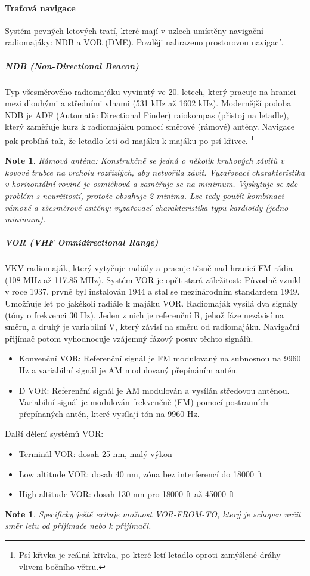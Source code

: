 \documentclass[11pt,a4paper]{article}
\theoremstyle{my-theorem}
\theoremstyle{non-theorem}
\newtheorem{note}[theorem]{Note}
\begin{document}
\paragraph*{Traťová navigace} Systém pevných letových tratí, které mají v uzlech umístěny navigační radiomajáky: NDB a VOR (DME). Později nahrazeno prostorovou navigací.

\subparagraph*{NDB (Non-Directional Beacon)} Typ všesměrového radiomajáku vyvinutý ve 20. letech, který pracuje na hranici mezi dlouhými a středními vlnami (531 kHz až 1602 kHz). Modernější podoba NDB je ADF (Automatic Directional Finder) raiokompas (přistoj na letadle), který zaměřuje kurz k radiomajáku pomocí směrové (rámové) antény. Navigace pak probíhá tak, že letadlo letí od majáku k majáku po psí křivce.%
    \footnote{Psí křivka je reálná křivka, po které letí letadlo oproti zamýšlené dráhy vlivem bočního větru.}
\begin{note}
    \emph{Rámová anténa:} Konstrukčně se jedná o několik kruhových závitů v kovové trubce na vrcholu rozřízlých, aby netvořila závit. Vyzařovací charakteristika v horizontální rovině je osmičková a zaměřuje se na minimum. Vyskytuje se zde problém s neurčitostí, protože obsahuje 2 minima. Lze tedy použít kombinaci rámové a všesměrové antény: vyzařovací charakteristika typu kardioidy (jedno minimum).
\end{note}

\subparagraph*{VOR (VHF Omnidirectional Range)} VKV radiomaják, který vytyčuje radiály a pracuje těsně nad hranicí FM rádia (108 MHz až 117.85 MHz). Systém VOR je opět stará záležitost: Původně vznikl v roce 1937, prvně byl instalován 1944 a stal se mezinárodním standardem 1949. Umožňuje let po jakékoli radiále k majáku VOR. Radiomaják vysílá dva signály (tóny o frekvenci 30 Hz). Jeden z nich je referenční R, jehož fáze nezávisí na směru, a druhý je variabilní V, který závisí na směru od radiomajáku. Navigační přijímač potom vyhodnocuje vzájemný fázový posuv těchto signálů.
\begin{itemize}
    \item Konvenční VOR: Referenční signál je FM modulovaný na subnosnou na 9960 Hz a variabilní signál je AM modulovaný přepínáním antén.
    \item D VOR: Referenční signál je AM modulován a vysílán středovou anténou. Variabilní signál je modulován frekvenčně (FM) pomocí postranních přepínaných antén, které vysílají tón na 9960 Hz.
\end{itemize}
Další dělení systémů VOR:
\begin{itemize}
    \item Terminál VOR: dosah 25 nm, malý výkon
    \item Low altitude VOR: dosah 40 nm, zóna bez interferencí do 18000 ft
    \item High altitude VOR: dosah 130 nm pro 18000 ft až 45000 ft
\end{itemize}
\begin{note}
    Specificky ještě exituje možnost VOR-FROM-TO, který je schopen určit směr letu od přijímače nebo k přijímači.
\end{note}
\end{document}
